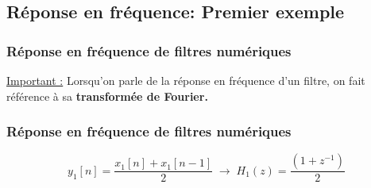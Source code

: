 \documentclass{beamer}
\begin{document}
\subsection{Réponse en fréquence: Premier exemple}
\begin{frame}
\frametitle{Réponse en fréquence de filtres numériques}
\underline{Important :} Lorsqu'on parle de la réponse en fréquence d'un filtre, on fait référence à sa \textbf{transformée de Fourier.}\\
\vspace{0.3cm}


\vspace{0.4cm}
\end{frame}

\begin{frame}
\frametitle{Réponse en fréquence de filtres numériques} 
\[ y_1[n] = \frac{x_1[n] + x_1[n-1]}{2}  \; \rightarrow \; H_1(z) = \frac{(1 + z^{-1})}{2} \]

\vspace{0.3cm}
\vspace{0.3cm}

\vspace{0.3cm}
\end{frame}
\end{document}
